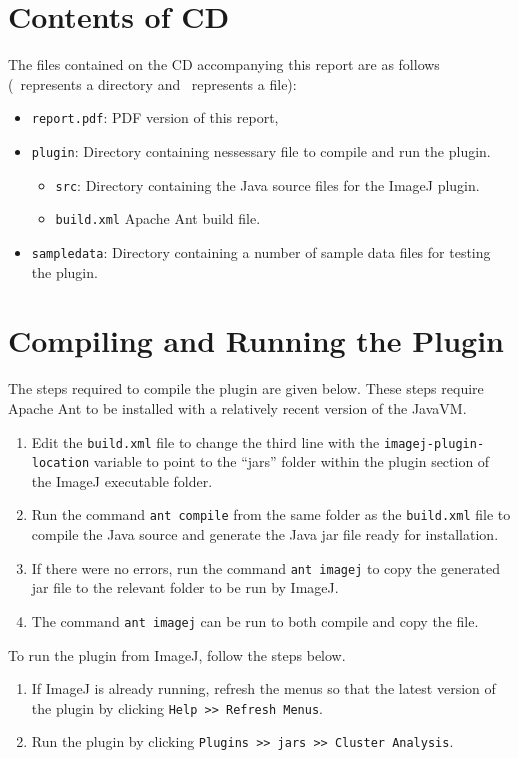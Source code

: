 
\section{Contents of CD}
\label{sec:contents_of_cd}

The files contained on the CD accompanying this report are as follows
(\folder~represents a directory and \file~represents a file):
\begin{itemize}
	\item[\file] \texttt{report.pdf}: PDF version of this report,
	\item[\folder] \texttt{plugin}: Directory containing nessessary file to
		compile and run the plugin.
		\begin{itemize}
			\item[\folder] \texttt{src}: Directory containing the Java source
				files for the ImageJ plugin.
			\item[\file] \texttt{build.xml} Apache Ant build file.
		\end{itemize}
	\item[\folder] \texttt{sampledata}: Directory containing a number of sample
		data files for testing the plugin.
\end{itemize}

\section{Compiling and Running the Plugin}
\label{sec:running_the_plugin}

The steps required to compile the plugin are given below. These steps require
Apache Ant to be installed with a relatively recent version of the JavaVM\@.
\begin{enumerate}
	\item Edit the \texttt{build.xml} file to change the third line with the
		\texttt{imagej-plugin-location} variable to point to the ``jars''
		folder within the plugin section of the ImageJ executable folder.
	\item Run the command \texttt{ant compile} from the same folder as the
		\texttt{build.xml} file to compile the Java source and generate the
		Java jar file ready for installation.
	\item If there were no errors, run the command \texttt{ant imagej} to copy
		the generated jar file to the relevant folder to be run by ImageJ.
	\item The command \texttt{ant imagej} can be run to both compile and copy
		the file.
\end{enumerate}

To run the plugin from ImageJ, follow the steps below.
\begin{enumerate}
	\item If ImageJ is already running, refresh the menus so that the latest
		version of the plugin by clicking \texttt{Help >> Refresh Menus}.
	\item Run the plugin by clicking \texttt{Plugins >> jars >> Cluster
		Analysis}.
\end{enumerate}
